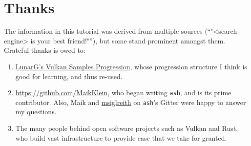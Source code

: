 \documentclass[12pt,letterpaper]{article}
\newcommand{\inquotes}[1]{``#1''}	%
\newcommand{\ash}{\texttt{ash}}
\begin{document}
\section{Thanks}
	The information in this tutorial was derived from multiple sources (\inquotes{"<search engine> is your best friend!"}), but some stand prominent amongst them. Grateful thanks is owed to:
		\begin{enumerate}
			\item \href{https://vulkan.lunarg.com/doc/sdk/1.0.65.1/windows/tutorial/html/index.html}{LunarG's Vulkan Samples Progression}, whose progression structure I think is good for learning, and thus re-used.
			
			\item \href{Maik Klein}{https://github.com/MaikKlein}, who began writing \ash, and is its prime contributor. Also, Maik and \href{https://github.com/msiglreith}{msiglreith} on \ash's Gitter were happy to answer my questions.
			
			\item The many people behind open software projects such as Vulkan and Rust, who build vast infrastructure to provide ease that we take for granted. 
		\end{enumerate}
\printbibliography
\end{document}
